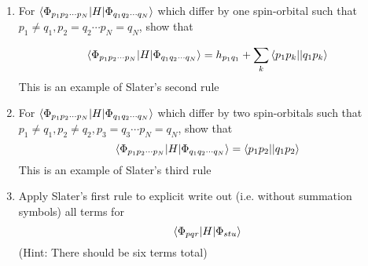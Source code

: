 \documentclass{article}
\newcommand{\cd}{\ensuremath{\cdots} }
\begin{document}
\begin{enumerate}
 \item For $\braket{\Phi_{p_1 p_2 \cd p_N} | H | \Phi_{q_1 q_2 \cd q_N} }$ which differ by one spin-orbital such that $p_1 \neq q_1, p_2 = q_2 \cd p_N = q_N$, show that 
 
 \[\braket{\Phi_{p_1 p_2 \cd p_N} | H | \Phi_{q_1 q_2 \cd q_N} } = h_{p_1 q_1}  + \sum_k \braket{p_1 p_k || q_1 p_k}  \]
 This is an example of Slater's second rule
 
 \item For $\braket{\Phi_{p_1 p_2 \cd p_N} | H | \Phi_{q_1 q_2 \cd q_N} }$ which differ by two spin-orbitals such that $p_1 \neq q_1, p_2 \neq q_2, p_3 = q_3 \cd p_N = q_N$, show that
\[\braket{\Phi_{p_1 p_2 \cd p_N} | H | \Phi_{q_1 q_2 \cd q_N} } =  \braket{p_1 p_2 || q_1 p_2}  \]
   This is an example of Slater's third rule
 \item Apply Slater's first rule to explicit write out (i.e. without summation symbols) all terms for  \[\braket{\Phi_{pqr} | H| \Phi_{stu}} \]
 (Hint: There should be six terms total)
 
\end{enumerate}
\end{document}
